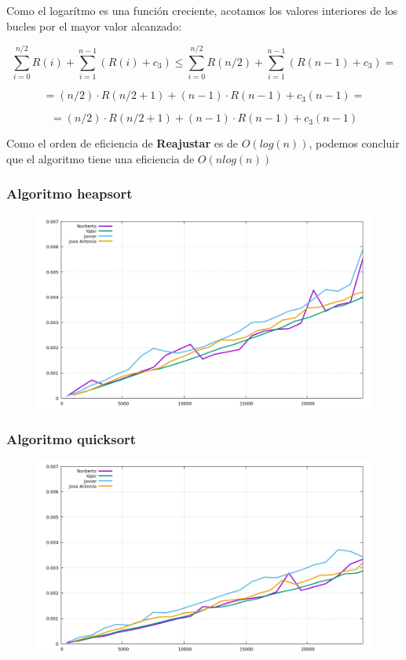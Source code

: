 \documentclass[spanish]{beamer}
\begin{document}
\begin{frame}
  Como el logarítmo es una función creciente, acotamos los valores interiores de los bucles por el mayor valor alcanzado:

$$\sum_{i=0}^{n/2} R(i) + \sum_{i=1}^{n-1} (R(i) + c_3) \leq \sum_{i=0}^{n/2} R(n/2) + \sum_{i=1}^{n-1} (R(n-1) + c_3) = $$

$$= (n/2) \cdot R(n/2 + 1) + (n-1) \cdot R(n - 1) + c_3(n-1) = $$

$$= (n/2) \cdot R(n/2 + 1) + (n-1) \cdot R(n - 1) + c_3(n-1)$$
\end{frame}


\begin{frame}
  Como el orden de eficiencia de \textbf{Reajustar} es de $O(log(n))$,
  podemos concluir que el algoritmo tiene una eficiencia de
  $O(nlog(n))$
\end{frame}

\begin{frame}\frametitle{Algoritmo heapsort}
  \begin{figure}[H]
    \centering   
        \includegraphics[clip,width=1\columnwidth]{../plots/heapsort}%
    \end{figure}
  \end{frame}

\begin{frame}\frametitle{Algoritmo quicksort}
  \begin{figure}[H]
    \centering   
        \includegraphics[clip,width=1\columnwidth]{../plots/quicksort}%
    \end{figure}
  \end{frame}
\end{document}
